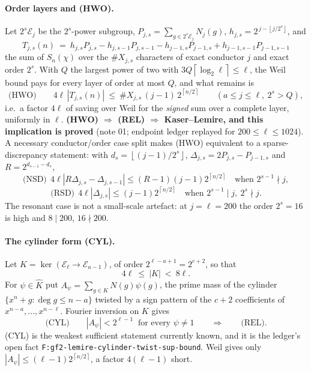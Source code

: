 \documentclass[10pt]{article}
\theoremstyle{plain}
\theoremstyle{definition}
\newcommand{\E}{\mathcal E}
\newcommand{\ceil}[1]{\left\lceil #1\right\rceil}
\newcommand{\flr}[1]{\left\lfloor #1\right\rfloor}
\begin{document}
\paragraph{Order layers and (HWO).} Let $2^s\E_j$ be the $2^s$-power subgroup,
$P_{j,s}=\sum_{g\in2^s\E_j}N_j(g)$, $h_{j,s}=2^{\,j-\flr{j/2^s}}$, and
\[
 T_{j,s}(n)\ =\ h_{j,s}P_{j,s}-h_{j,s-1}P_{j,s-1}-h_{j-1,s}P_{j-1,s}
 +h_{j-1,s-1}P_{j-1,s-1}
\]
the sum of $S_n(\chi)$ over the $\#X_{j,s}$ characters of exact conductor $j$
and exact order $2^s$. With $Q$ the largest power of two with $3Q\ceil{\log_2\ell}\le\ell$,
the Weil bound pays for every layer of order at most $Q$, and what remains is
\[
 \textrm{(HWO)}\qquad
 4\ell\,|T_{j,s}(n)|\ \le\ \#X_{j,s}\,(j-1)\,2^{\ceil{n/2}}
 \qquad(a\le j\le\ell,\ 2^s>Q),
\]
i.e.\ a factor $4\ell$ of saving over Weil for the \emph{signed} sum over a
complete layer, uniformly in $\ell$. \textbf{(HWO) $\Rightarrow$ (REL)
$\Rightarrow$ Kaser--Lemire, and this implication is proved} (note 01;
endpoint ledger replayed for $200\le\ell\le1024$). A necessary
conductor/order case split makes (HWO) equivalent to a sparse-discrepancy
statement: with $d_s=\flr{(j-1)/2^s}$, $\Delta_{j,s}=2P_{j,s}-P_{j-1,s}$ and
$R=2^{d_{s-1}-d_s}$,
\[
 \textrm{(NSD)}\ \ 4\ell|R\Delta_{j,s}-\Delta_{j,s-1}|\le(R-1)(j-1)2^{\ceil{n/2}}
 \quad\text{when } 2^{s-1}\nmid j,
\]
\[
 \textrm{(RSD)}\ \ 4\ell|\Delta_{j,s}|\le(j-1)2^{\ceil{n/2}}
 \quad\text{when } 2^{s-1}\mid j,\ 2^s\nmid j .
\]
The resonant case is not a small-scale artefact: at $j=\ell=200$ the order
$2^s=16$ is high and $8\mid200$, $16\nmid200$.

\paragraph{The cylinder form (CYL).} Let $K=\ker(\E_\ell\to\E_{a-1})$, of order
$2^{\ell-a+1}=2^{c+2}$, so that
\begin{equation}\label{eq:ksize}
 4\ell\ \le\ |K|\ <\ 8\ell .
\end{equation}
For $\psi\in\widehat K$ put $A_\psi=\sum_{g\in K}N(g)\psi(g)$, the prime mass of
the cylinder $\{x^n+g:\deg g\le n-a\}$ twisted by a sign pattern of the
$c+2$ coefficients of $x^{n-a},\dots,x^{n-\ell}$. Fourier inversion on $K$ gives
\[
 \textrm{(CYL)}\qquad |A_\psi|<2^{\ell-1}\ \text{ for every }\psi\ne1
 \qquad\Longrightarrow\qquad \textrm{(REL)} .
\]
(CYL) is the weakest sufficient statement currently known, and it is the
ledger's open fact \texttt{F:gf2-\allowbreak lemire-\allowbreak cylinder-\allowbreak twist-\allowbreak sup-bound}. Weil gives
only $|A_\psi|\le(\ell-1)2^{\ceil{n/2}}$, a factor $4(\ell-1)$ short.
\end{document}
